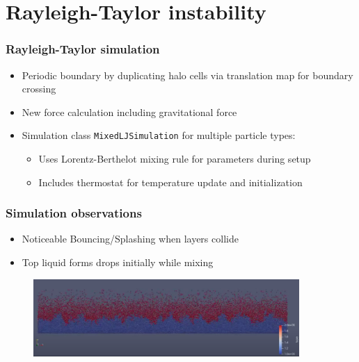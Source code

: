 
\section{Rayleigh-Taylor instability}
\label{sec:rayleigh}

\begin{frame}
    \frametitle{Rayleigh-Taylor simulation}
    \begin{itemize}
        \item Periodic boundary by duplicating halo cells via translation map for boundary crossing
        \item New force calculation including gravitational force
        \item Simulation class \texttt{MixedLJSimulation} for multiple particle types:
        \begin{itemize}
            \item Uses Lorentz-Berthelot mixing rule for parameters during setup
            \item Includes thermostat for temperature update and initialization
        \end{itemize}
    \end{itemize}
\end{frame}

\begin{frame}
    \frametitle{Simulation observations}
    \begin{itemize}
        \item Noticeable Bouncing/Splashing when layers collide
        \item Top liquid forms drops initially while mixing
    \end{itemize}
    \begin{figure}
        \label{fig:bounce}
        \includegraphics[width=0.9\textwidth]{../../res/rayleigh_bounce}
    \end{figure}
\end{frame}